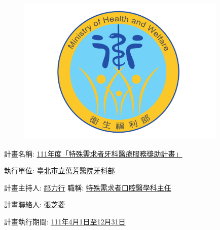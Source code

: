 \documentclass[12pt,twoside]{article}
\theoremstyle{plain}
\theoremstyle{definition}
\theoremstyle{remark}
\begin{document}


\thispagestyle{empty}

\vspace{1.6cm}
\begin{figure}[H]
    \centering
\includegraphics[width=10cm]{MOHW_LOGO_0030101001.pdf}
\end{figure}
\vspace{2cm}

{\Large
計畫名稱: \underline{111年度「特殊需求者牙科醫療服務獎助計畫」}
\vspace{4mm}

執行單位: \underline{臺北市立萬芳醫院牙科部} %
\vspace{4mm}

計畫主持人: \underline{祁力行} \hspace{5cm} 職稱: \underline{特殊需求者口腔醫學科主任}
\vspace{1mm}

計畫聯絡人: \underline{張芝菱}
\vspace{4mm}

計畫執行期間: \underline{111年4月1日至12月31日}
}
\clearpage
\end{document}
